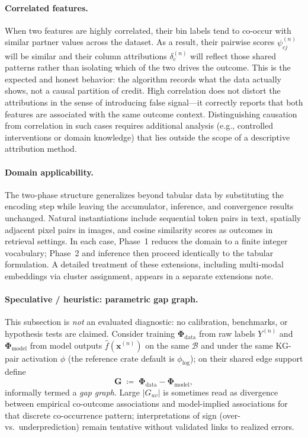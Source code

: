 \documentclass[11pt]{article}
\begin{document}
\paragraph{Correlated features.}
When two features are highly correlated, their bin labels tend to co-occur with similar partner values across the dataset.
As a result, their pairwise scores $\psi_{cj}^{(n)}$ will be similar and their column attributions $\delta_c^{(n)}$ will reflect those shared patterns rather than isolating which of the two drives the outcome.
This is the expected and honest behavior: the algorithm records what the data actually shows, not a causal partition of credit.
High correlation does not distort the attributions in the sense of introducing false signal---it correctly reports that both features are associated with the same outcome context.
Distinguishing causation from correlation in such cases requires additional analysis (e.g., controlled interventions or domain knowledge) that lies outside the scope of a descriptive attribution method.

\paragraph{Domain applicability.}
The two-phase structure generalizes beyond tabular data by substituting the encoding step while leaving the accumulator, inference, and convergence results unchanged.
Natural instantiations include sequential token pairs in text, spatially adjacent pixel pairs in images, and cosine similarity scores as outcomes in retrieval settings.
In each case, Phase~1 reduces the domain to a finite integer vocabulary; Phase~2 and inference then proceed identically to the tabular formulation.
A detailed treatment of these extensions, including multi-modal embeddings via cluster assignment, appears in a separate extensions note.

\paragraph{Speculative / heuristic: parametric gap graph.}
This subsection is \emph{not} an evaluated diagnostic: no calibration, benchmarks, or hypothesis tests are claimed.
Consider training $\bm{\Phi}_{\mathrm{data}}$ from raw labels $Y^{(n)}$ and $\bm{\Phi}_{\mathrm{model}}$ from model outputs $\hat{f}(\bm{x}^{(n)})$ on the same $\mathcal{B}$ and under the same KG-pair activation $\phi$ (the reference crate default is $\phi_{\log}$); on their shared edge support define
\begin{equation}
  \bm{G} \;\coloneqq\; \bm{\Phi}_{\mathrm{data}} - \bm{\Phi}_{\mathrm{model}},
  \label{eq:gap}
\end{equation}
informally termed a \emph{gap graph}.
Large $|G_{uv}|$ is sometimes read as divergence between empirical co-outcome associations and model-implied associations for that discrete co-occurrence pattern; interpretations of sign (over- vs.\ underprediction) remain tentative without validated links to realized errors.
\end{document}
